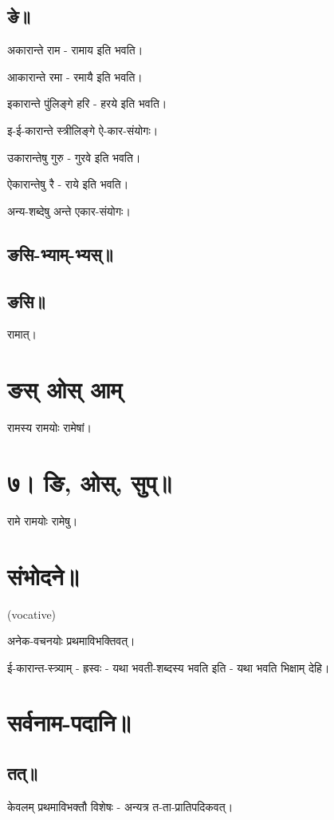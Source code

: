 \documentclass[oneside, article]{memoir}
\begin{document}
\subsection{ङे॥}
अकारान्ते राम - रामाय इति भवति।

आकारान्ते रमा - रमायै इति भवति।

इकारान्ते पुंलिङ्गे हरि - हरये इति भवति।

इ-ई-कारान्ते स्त्रीलिङ्गे ऐ-कार-संयोगः।

उकारान्तेषु गुरु - गुरवे इति भवति।

ऐकारान्तेषु रै - राये इति भवति।

अन्य-शब्देषु अन्ते एकार-संयोगः।

\subsection{ङसि-भ्याम्-भ्यस्॥}
\subsection{ङसि॥}
रामात्।

\section{ङस् ओस् आम्}
रामस्य रामयोः रामेषां।

\tbc

\section{७। ङि, ओस्, सुप्॥}
रामे रामयोः रामेषु।

\tbc

\section{संभोदने॥}
(vocative)

अनेक-वचनयोः प्रथमाविभक्तिवत्।

ई-कारान्त-स्त्र्याम् - ह्रस्वः - यथा भवती-शब्दस्य भवति इति - यथा भवति भिक्षाम् देहि।

\tbc

\section{सर्वनाम-पदानि॥}
\subsection{तत्॥}
केवलम् प्रथमाविभक्तौ विशेषः - अन्यत्र त-ता-प्रातिपदिकवत्।
\end{document}
